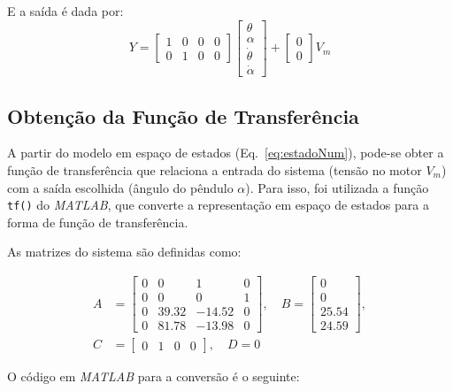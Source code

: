 \documentclass[9pt,a4paper,twocolumn,twoside]{tau-class/tau}
\begin{document}
E a saída é dada por:
\begin{equation}
Y =
\begin{bmatrix}
1 & 0 & 0 & 0 \\
0 & 1 & 0 & 0
\end{bmatrix}
\begin{bmatrix}
\theta \\ \alpha \\ \dot{\theta} \\ \dot{\alpha}
\end{bmatrix}
+
\begin{bmatrix}
0 \\ 0
\end{bmatrix} V_m
\end{equation}

\subsection{Obtenção da Função de Transferência}

A partir do modelo em espaço de estados (Eq.~\ref{eq:estadoNum}), pode-se obter a 
função de transferência que relaciona a entrada do sistema (tensão no motor $V_m$) 
com a saída escolhida (ângulo do pêndulo $\alpha$). Para isso, foi utilizada a 
função \texttt{tf()} do \textit{MATLAB}, que converte a representação em espaço 
de estados para a forma de função de transferência.

As matrizes do sistema são definidas como:

\begin{equation}
\begin{split}
A &=
\begin{bmatrix}
0 & 0 & 1 & 0 \\
0 & 0 & 0 & 1 \\
0 & 39.32 & -14.52 & 0 \\
0 & 81.78 & -13.98 & 0
\end{bmatrix}, \quad
B =
\begin{bmatrix}
0 \\ 0 \\ 25.54 \\ 24.59
\end{bmatrix}, \\
C &= 
\begin{bmatrix}
0 & 1 & 0 & 0
\end{bmatrix}, \quad
D = 0
\end{split}
\end{equation}

O código em \textit{MATLAB} para a conversão é o seguinte:
\end{document}
